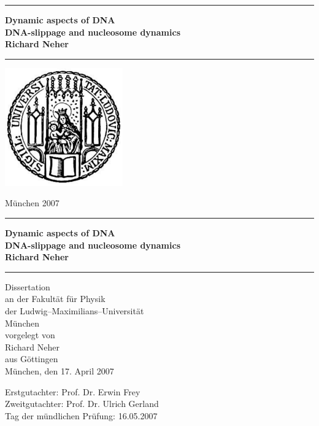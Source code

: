 \documentclass[12pt, twoside, a4paper]{scrbook}
\newcommand{\LMUTitle}[9]{
  \thispagestyle{empty}
  \vspace*{\stretch{1}}
  {\parindent0cm
   \rule{\linewidth}{.7ex}}
  \begin{flushright}

    \vspace*{\stretch{1}}
    \sffamily\bfseries\Huge
    #1\\
    \vspace*{\stretch{1}}
    \sffamily\bfseries\large
    #2
    \vspace*{\stretch{1}}
  \end{flushright}
  \rule{\linewidth}{.7ex}
  \vspace*{\stretch{5}}
  \begin{center}
    \includegraphics[width=2in]{siegel}
  \end{center}
  \vspace*{\stretch{1}}
  \begin{center}\sffamily\LARGE{#5}\end{center}
  \newpage
  \thispagestyle{empty}

  \cleardoublepage
  \thispagestyle{empty}

  \vspace*{\stretch{1}}
  {\parindent0cm
  \rule{\linewidth}{.7ex}}
  \begin{flushright}
    \vspace*{\stretch{1}}
    \sffamily\bfseries\Huge
    #1\\
    \vspace*{\stretch{1}}
    \sffamily\bfseries\large
    #2
    \vspace*{\stretch{1}}
  \end{flushright}
  \rule{\linewidth}{.7ex}

  \vspace*{\stretch{3}}
  \begin{center}
    \Large Dissertation\\
    \Large an der #4\\
    \Large der Ludwig--Maximilians--Universit\"at\\
    \Large M\"unchen\\
    \vspace*{\stretch{1}}
    \Large vorgelegt von\\
    \Large #2\\
    \Large aus #3\\
    \vspace*{\stretch{2}}
    \Large M\"unchen, den #6
  \end{center}

  \newpage
  \thispagestyle{empty}

  \vspace*{\stretch{1}}

  \begin{flushleft}
    \large Erstgutachter:  #7 \\[1mm]
    \large Zweitgutachter: #8 \\[1mm]
    \large Tag der m\"undlichen Pr\"ufung: #9\\
  \end{flushleft}

  \cleardoublepage
}
\begin{document}
  \frontmatter


  \LMUTitle
      {Dynamic aspects of DNA \\
       \large{DNA-slippage and nucleosome dynamics}}               %
      {Richard Neher}                       %
      {G\"ottingen}                             %
      {Fakult\"at f\"ur Physik}                         %
      {M\"unchen 2007}                          %
      {17. April 2007}                            %
      {Prof. Dr. Erwin Frey}                          %
      {Prof. Dr. Ulrich Gerland}                         %
      {16.05.2007}                         %


  \tableofcontents


  \listoffigures




 
 


  \mainmatter\setcounter{page}{1}
  
  
  
	
  \appendix
  
  
  
  \backmatter
  
  \markboth{}{}
\printglossary[4cm]
  \markboth{}{}
 
  
\end{document}
